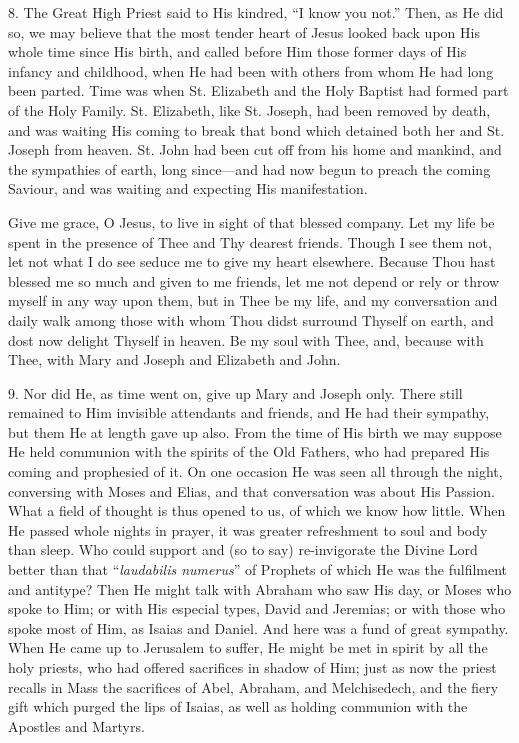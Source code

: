 8. The Great High Priest said to
His kindred, ``I know you not.'' Then, as He did so, we may believe that
the most tender heart of Jesus looked back upon His whole time since His
birth, and called before Him those former days of His infancy and
childhood, when He had been with others from whom He had long been
parted. Time was when St. Elizabeth and the Holy Baptist had formed part
of the Holy Family. St. Elizabeth, like St. Joseph, had been
removed by death, and was waiting His coming to break that bond which
detained both her and St. Joseph from heaven. St. John had been cut off
from his home and mankind, and the sympathies of earth, long since—and
had now begun to preach the coming Saviour, and was waiting and
expecting His manifestation.

Give me grace, O Jesus, to live
in sight of that blessed company. Let my life be spent in the presence
of Thee and Thy dearest friends. Though I see them not, let not what I
do see seduce me to give my heart elsewhere. Because Thou hast blessed
me so much and given to me friends, let me not depend or rely or throw
myself in any way upon them, but in Thee be my life, and my conversation
and daily walk among those with whom Thou didst surround Thyself on
earth, and dost now delight Thyself in heaven. Be my soul with Thee,
and, because with Thee, with Mary and Joseph and Elizabeth and John.

9. Nor did He, as time went on,
give up Mary and Joseph only. There still remained to Him invisible
attendants and friends, and He had their sympathy, but them He at length
gave up also. From the time of His birth we may suppose He held
communion with the spirits of the Old Fathers, who had prepared His
coming and prophesied of it. On one occasion He was seen all through the
night, conversing with Moses and Elias, and that conversation was about
His Passion. What a field of thought is thus opened to us, of which we
know how little. When He passed whole nights in prayer, it was
greater refreshment to soul and body than sleep. Who could support and
(so to say) re-invigorate the Divine Lord better than that ``\emph{laudabilis
numerus}'' of Prophets of which He was the fulfilment and antitype?
Then He might talk with Abraham who saw His day, or Moses who spoke to
Him; or with His especial types, David and Jeremias; or with those who
spoke most of Him, as Isaias and Daniel. And here was a fund of great
sympathy. When He came up to Jerusalem to suffer, He might be met in
spirit by all the holy priests, who had offered sacrifices in shadow of
Him; just as now the priest recalls in Mass the sacrifices of Abel,
Abraham, and Melchisedech, and the fiery gift which purged the lips of
Isaias, as well as holding communion with the Apostles and Martyrs.


